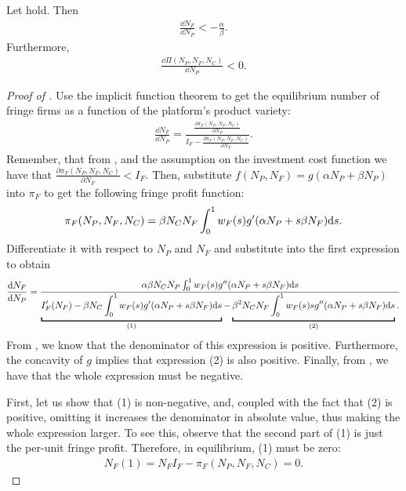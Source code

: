\begin{proposition}
    \label{prop:aggregate_size_additive}
    Let  hold.
    Then
    \begin{align*}
        \frac{\dd N_F}{\dd N_P} < -\frac{\alpha}{\beta}.
    \end{align*}
    Furthermore,
    \begin{align*}
        \frac{\dd \Pi(N_P, N_F, N_C)}{\dd N_P} < 0.
    \end{align*}
\end{proposition}
\begin{proof}[Proof of ]
    Use the implicit function theorem to get the equilibrium number of fringe firms as a function of the platform's product variety:
    \begin{align*}
        \frac{\dd N_F}{\dd N_P} = \frac{\frac{\partial \pi_F(N_P, N_F, N_C)}{\partial N_P}}{I_F - \frac{\partial \pi_F (N_P, N_F, N_C)}{\partial N_F}}.
    \end{align*}
    Remember, that from , and the assumption on the investment cost function we have that $\frac{\partial \pi_F (N_P, N_F, N_C)}{\partial N_F} < I_F$.
    Then, substitute $f(N_P, N_F) = g(\alpha N_P + \beta N_P)$ into $\pi_F$ to get the following fringe profit function:
    \begin{align*}
        \pi_F(N_P, N_F, N_C) = \beta N_C N_F \int_0^1 w_F(s) g'(\alpha N_P + s \beta N_F) \mathrm{d}s.
    \end{align*}
    Differentiate it with respect to $N_P$ and $N_F$ and substitute into the first expression to obtain
    \begin{align*}
        \frac{\dd N_F}{\dd N_P} = \frac{
            \alpha \beta N_C N_P \int_0^1 w_F(s) g''(\alpha N_P + s \beta N_F) \ds
        }{
            \underbracket{I'_F(N_F) - \beta N_C \int_0^1 w_F(s) g'(\alpha N_P + s \beta N_F) \ds}_{(1)} - \underbracket{\beta^2 N_C N_F \int_0^1 w_F(s) s g''(\alpha N_P + s \beta N_F) \ds}_{(2)}.
        }
    \end{align*}
    From , we know that the denominator of this expression is positive.
    Furthermore, the concavity of $g$ implies that expression (2) is also positive.
    Finally, from , we have that the whole expression must be negative.

    First, let us show that (1) is non-negative, and, coupled with the fact that (2) is positive, omitting it increases the denominator in absolute value, thus making the whole expression larger.
    To see this, observe that the second part of (1) is just the per-unit fringe profit.
    Therefore, in equilibrium, (1) must be zero:
    \begin{align*}
        N_F (1) = N_F I_F - \pi_F(N_P, N_F, N_C) = 0.
    \end{align*}


\end{proof}
